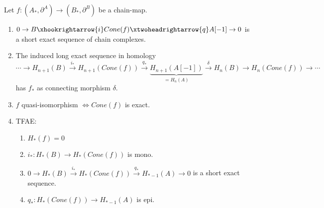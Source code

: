 \documentclass[fontsize=11pt,fleqn,a4paper]{scrartcl}
\begin{document}
\begin{lemma}
Let $f:(A_\ast,\partial^A)\to(B_\ast,\partial^B)$ be a chain-map.
\begin{enumerate}
\item $0 \to B \xhookrightarrow{i} Cone(f) \xtwoheadrightarrow{q} A[-1] \to 0$ is a short exact sequence of chain complexes.
\item The induced long exact sequence in homology
\[\cdots \to H_{n+1}(B) \xrightarrow{i_\ast} H_{n+1}(Cone(f)) \xrightarrow{q_\ast} \underbrace{H_{n+1}(A[-1])}_{=H_n(A)} \xrightarrow{\delta} H_n(B) \to H_n(Cone(f)) \to \cdots\]
has $f_\ast$ as connecting morphism $\delta$.
\item $f$ quasi-isomorphism $\iff Cone(f)$ is exact.
\item TFAE:
\begin{enumerate}
\item $H_\ast(f)=0$
\item $i_\ast: H_\ast(B) \to H_\ast(Cone(f))$ is mono.
\item $0\to H_\ast(B) \xrightarrow{i_\ast} H_\ast(Cone(f)) \xrightarrow{q_\ast} H_{\ast-1}(A)\to 0$ is a short exact sequence.
\item $q_\ast: H_\ast(Cone(f)) \to H_{\ast-1}(A)$ is epi.
\end{enumerate}
\end{enumerate}
\end{lemma}
\end{document}

